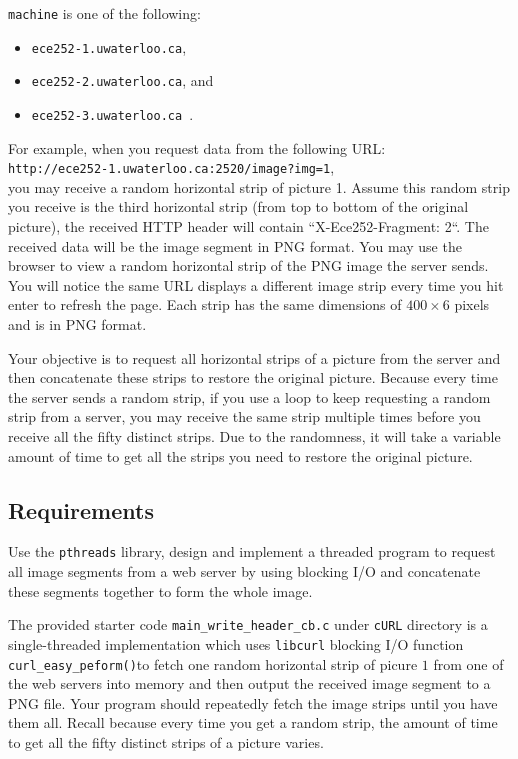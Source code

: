 \texttt{machine} is one of the following:
\begin{itemize}
\item \texttt{ece252-1.uwaterloo.ca},
\item \texttt{ece252-2.uwaterloo.ca}, and 
\item \texttt{ece252-3.uwaterloo.ca}~.
\end{itemize}

For example, when you request data from the following URL: \\
\verb+http://ece252-1.uwaterloo.ca:2520/image?img=1+,  \\
you may receive a random horizontal strip of picture 1. Assume this random strip you receive is the third horizontal strip (from top to bottom of the original picture), the received HTTP header will contain ``X-Ece252-Fragment: 2``. The received data will be the image segment in PNG format.
You may use the browser to view a random horizontal strip of the PNG image the server sends. You will notice the same URL displays a different image strip every time you hit enter to refresh the page. Each strip has the same dimensions of $400 \times 6$ pixels and is in PNG format. 

Your objective is to request all horizontal strips of a picture from the server and then concatenate these strips to restore the original picture. Because every time the server sends a random strip, if you use a loop to keep requesting a random strip from a server, you may receive the same strip multiple times before you receive all the fifty distinct strips. Due to the randomness, it will take a variable amount of time to get all the strips you need to restore the original picture.

\subsection{Requirements}

Use the \verb+pthreads+ library, design and implement a threaded program to request all image segments from a web server by using blocking I/O and concatenate these segments together to form the whole image.

The provided starter code \verb+main_write_header_cb.c+ under \verb+cURL+ directory is a single-threaded implementation which uses \verb+libcurl+ blocking I/O function \verb+curl_easy_peform()+to fetch one random horizontal strip of picure $1$ from one of the web servers into memory and then output the received image segment to a PNG file. Your  program should repeatedly fetch the image strips until you have them all. Recall because every time you get a random strip, the amount of time to get all the fifty distinct strips of a picture varies.

